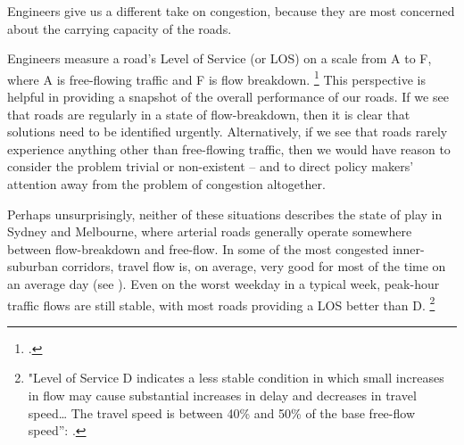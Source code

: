 \documentclass{grattan}
\begin{document}
Engineers give us a different take on congestion, because they are most concerned about the carrying capacity of the roads.

Engineers measure a road's Level of Service (or LOS) on a scale from A to F, where A is free-flowing traffic and F is flow breakdown.%
    \footcite[][Part~3: Traffic Studies and Analysis, p.~63]{Austroads-2015-Guide-Traffic-Mgmt}
This perspective is helpful in providing a snapshot of the overall performance of our roads. If we see that roads are regularly in a state of flow-breakdown, then it is clear that solutions need to be identified urgently. Alternatively, if we see that roads rarely experience anything other than free-flowing traffic, then we would have reason to consider the problem trivial or non-existent -- and to direct policy makers' attention away from the problem of congestion altogether.

Perhaps unsurprisingly, neither of these situations describes the state of play in Sydney and Melbourne, where arterial roads generally operate somewhere between flow-breakdown and free-flow. In some of the most congested inner-suburban corridors, travel flow is, on average, very good for most of the time on an average day
(see ).
Even on the worst weekday in a typical week, peak-hour traffic flows are still stable, with most roads providing a LOS better than D.%
    \footnote{"Level of Service D indicates a less stable condition in which small increases in flow may cause substantial increases in delay and decreases in travel speed\dots{} The travel speed is between 40\% and 50\% of the base free-flow speed'': \textcite[][Part~3, p.~63]{Austroads-2015-Guide-Traffic-Mgmt}.}
\end{document}
